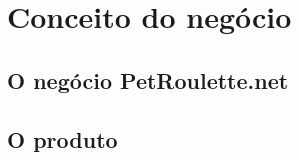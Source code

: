\chapter{Conceito do negócio}

\cite{bygrave2010entrepreneurship}

\cite{cuervo2007entrepreneurship}


\section{O negócio PetRoulette.net}

\section{O produto}

